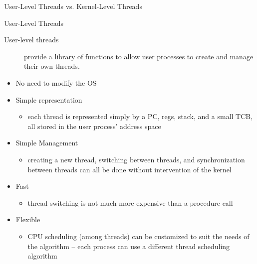 \begin{frame}{User-Level Threads vs. Kernel-Level Threads}
  \begin{center}
  \end{center}
\end{frame}

\begin{frame}{User-Level Threads}
  \begin{description}
  \item[User-level threads] provide a library of functions to allow user processes to create and
    manage their own threads.
  \end{description}
  \begin{itemize}
  \item[\good] No need to modify the OS\\[-.5ex]
  \item[\good] Simple representation\\[-.5ex]
    \begin{itemize}
    \item each thread is represented simply by a PC, regs, stack, and a small TCB, all
        stored in the user process' address space
    \end{itemize}
  \item[\good] Simple Management\\[-.5ex]
    \begin{itemize}
    \item creating a new thread, switching between threads, and synchronization between threads can
      all be done without intervention of the kernel
    \end{itemize}
  \item[\good] Fast\\[-.5ex]
    \begin{itemize}
    \item thread switching is not much more expensive than a procedure call
    \end{itemize}
  \item[\good] Flexible\\[-.5ex]
    \begin{itemize}
    \item CPU scheduling (among threads) can be customized to suit the needs of the algorithm --
      each process can use a different thread scheduling algorithm
    \end{itemize}
  \end{itemize}
\end{frame}

